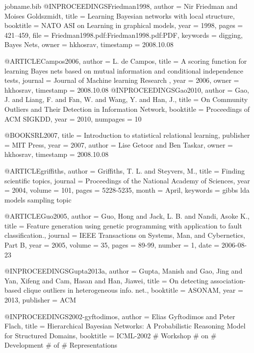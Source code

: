 {\begin{filecontents*}{jobname.bib}
	@INPROCEEDINGS{Friedman1998,
		author = {Nir Friedman and Moises Goldszmidt},
		title = {Learning {B}ayesian networks with local structure},
		booktitle = {NATO ASI on Learning in graphical models},
		year = {1998},
		pages = {421--459},
		file = {Friedman1998.pdf:Friedman1998.pdf:PDF},
		keywords = {digging, {B}ayes Nets},
		owner = {hkhosrav},
		timestamp = {2008.10.08}
	}
	
	@ARTICLE{Campos2006,
		author = {L. de Campos},
		title = {A scoring function for learning {B}ayes nets based on mutual information
			and conditional independence tests},
		journal = {Journal of Machine learning Research },
		year = {2006},
		owner = {hkhosrav},
		timestamp = {2008.10.08}
	}
	@INPROCEEDINGS{Gao2010,
		author = {Gao, J. and Liang, F. and Fan, W. and Wang, Y. and Han, J.},
		title = {On Community Outliers and Their Detection in Information Network},
		booktitle = {Proceedings of ACM SIGKDD},
		year = {2010},
		numpages = {10}
	}
	
	@BOOK{SRL2007,
		title = {Introduction to statistical relational learning},
		publisher = {MIT Press},
		year = {2007},
		author = {Lise Getoor and Ben Taskar},
		owner = {hkhosrav},
		timestamp = {2008.10.08}
	}
	
	@ARTICLE{griffiths,
		author = {Griffiths, T. L. and Steyvers, M.},
		title = {Finding scientific topics},
		journal = {Proceedings of the National Academy of Sciences},
		year = {2004},
		volume = {101},
		pages = {5228-5235},
		month = {April},
		keywords = {gibbs lda models sampling topic}
	}
	
	@ARTICLE{Guo2005,
		author = {Guo, Hong and Jack, L. B. and Nandi, Asoke K.},
		title = {Feature generation using genetic programming with application to
			fault classification.},
		journal = {IEEE Transactions on Systems, Man, and Cybernetics, Part B},
		year = {2005},
		volume = {35},
		pages = {89-99},
		number = {1},
		date = {2006-08-23}
	}
	
	@INPROCEEDINGS{Gupta2013a,
		author = {Gupta, Manish and Gao, Jing and Yan, Xifeng and Cam, Hasan and Han,
			Jiawei},
		title = {On detecting association-based clique outliers in heterogeneous info.
			net.},
		booktitle = {ASONAM},
		year = {2013},
		publisher = {ACM}
	}
	
	@INPROCEEDINGS{2002-gyftodimos,
		author = {Elias Gyftodimos and Peter Flach},
		title = {Hierarchical Bayesian Networks: A Probabilistic Reasoning Model for
			Structured Domains},
		booktitle = ICML-2002 # Workshop # on # Development # of # Representations
	}
	

\end{filecontents*}}
